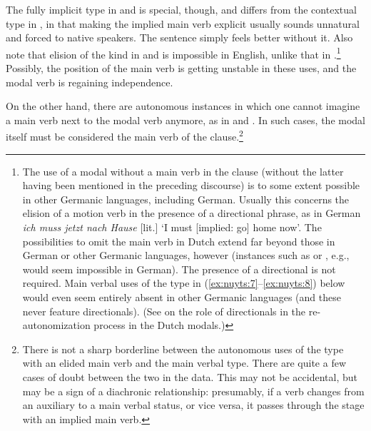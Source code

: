 \documentclass[output=paper]{langsci/langscibook}
\begin{document}
The fully implicit type in  and  is special, though, and differs from the contextual type in , in that making the implied main verb explicit usually sounds unnatural and forced to native speakers. The sentence simply feels better without it. Also note that elision of the kind in  and  is impossible in English, unlike that in .\footnote{The use of a modal without a main verb in the clause (without the latter having been mentioned in the preceding discourse) is to some extent possible in other Germanic languages, including German. Usually this concerns the elision of a motion verb in the presence of a directional phrase, as in German \textit{ich muss jetzt nach Hause} [lit.] ‘I must [implied: go] home now’. The possibilities to omit the main verb in Dutch extend far beyond those in German or other Germanic languages, however (instances such as  or , e.g., would seem impossible in German). The presence of a directional is not required. Main verbal uses of the type in (\ref{ex:nuyts:7}--\ref{ex:nuyts:8}) below would even seem entirely absent in other Germanic languages (and these never feature directionals). (See \citealt{CaersNuyts2021} on the role of directionals in the re-autonomization process in the Dutch modals.)} Possibly, the position of the main verb is getting unstable in these uses, and the modal verb is regaining independence.

On the other hand, there are autonomous instances in which one cannot imagine a main verb next to the modal verb anymore, as in  and . In such cases, the modal itself must be considered the main verb of the clause.\footnote{There is not a sharp borderline between the autonomous uses of the type with an elided main verb and the main verbal type. There are quite a few cases of doubt between the two in the data. This may not be accidental, but may be a sign of a diachronic relationship: presumably, if a verb changes from an auxiliary to a main verbal status, or vice versa, it passes through the stage with an implied main verb.}
\end{document}
